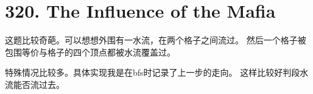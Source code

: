 \section{320. The Influence of the Mafia}
这题比较奇葩。可以想想外围有一水流，在两个格子之间流过。
然后一个格子被包围等价与格子的四个顶点都被水流覆盖过。
\par 特殊情况比较多。具体实现我是在bfs时记录了上一步的走向。
这样比较好判段水流能否流过去。
